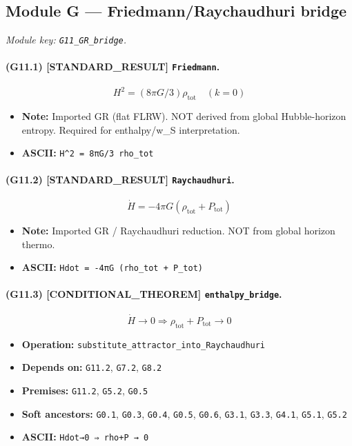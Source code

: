 \documentclass[11pt,a4paper]{article}
\theoremstyle{remark}\newtheorem*{caution}{Caution}
\newcommand{\tagbox}[1]{\textsc{[#1]}}
\begin{document}
\subsection{Module G --- Friedmann/Raychaudhuri bridge}
\textit{Module key: \texttt{G11\_GR\_bridge}.}
\paragraph{(G11.1) \tagbox{STANDARD\_RESULT} \texttt{Friedmann}.}
\begin{equation}
H^2=(8\pi G/3)\rho_{\mathrm{tot}}\quad(k=0)
\tag{G11.1}
\end{equation}
\begin{itemize}\setlength{\itemsep}{0.12em}
\item \textbf{Note:} Imported GR (flat FLRW). NOT derived from global Hubble-horizon entropy. Required for enthalpy/w\_S interpretation.
\item \textbf{ASCII:} \texttt{H^2 = 8πG/3 rho\_tot}
\end{itemize}
\paragraph{(G11.2) \tagbox{STANDARD\_RESULT} \texttt{Raychaudhuri}.}
\begin{equation}
\dot H=-4\pi G(\rho_{\mathrm{tot}}+P_{\mathrm{tot}})
\tag{G11.2}
\end{equation}
\begin{itemize}\setlength{\itemsep}{0.12em}
\item \textbf{Note:} Imported GR / Raychaudhuri reduction. NOT from global horizon thermo.
\item \textbf{ASCII:} \texttt{Hdot = -4πG (rho\_tot + P\_tot)}
\end{itemize}
\paragraph{(G11.3) \tagbox{CONDITIONAL\_THEOREM} \texttt{enthalpy\_bridge}.}
\begin{equation}
\dot H\to 0\Rightarrow\rho_{\mathrm{tot}}+P_{\mathrm{tot}}\to 0
\tag{G11.3}
\end{equation}
\begin{itemize}\setlength{\itemsep}{0.12em}
\item \textbf{Operation:} \texttt{substitute\_attractor\_into\_Raychaudhuri}
\item \textbf{Depends on:} \texttt{G11.2}, \texttt{G7.2}, \texttt{G8.2}
\item \textbf{Premises:} \texttt{G11.2}, \texttt{G5.2}, \texttt{G0.5}
\item \textbf{Soft ancestors:} \texttt{G0.1}, \texttt{G0.3}, \texttt{G0.4}, \texttt{G0.5}, \texttt{G0.6}, \texttt{G3.1}, \texttt{G3.3}, \texttt{G4.1}, \texttt{G5.1}, \texttt{G5.2}
\item \textbf{ASCII:} \texttt{Hdot→0 ⇒ rho+P → 0}
\end{itemize}
\end{document}
